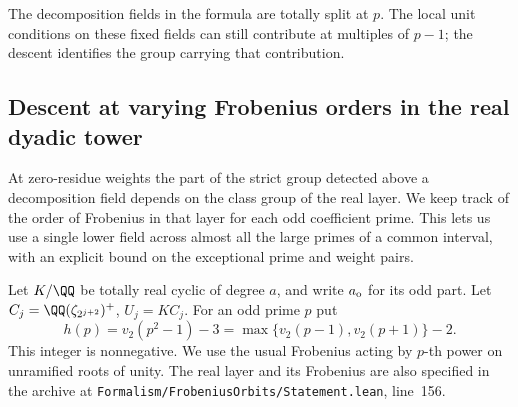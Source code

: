 \documentclass[a4paper,11pt]{article}
\theoremstyle{definition}
\theoremstyle{remark}
\newcommand{\srcloc}[2]{{\small\nolinkurl{#1.lean}}, line~#2}
\numberwithin{equation}{section}
\begin{document}
The decomposition fields in the formula are totally split at \(p\).
The local unit conditions on these fixed fields can still contribute
at multiples of \(p-1\); the descent identifies the group carrying
that contribution.


\subsection{Descent at varying Frobenius orders in the real dyadic tower}
\label{sec:varyingdecomposition642}

At zero-residue weights the part of the strict group detected
above a decomposition field depends on the class group of the
real layer. We keep track of the order of Frobenius in that
layer for each odd coefficient prime. This lets us use a single
lower field across almost all the large primes of a common
interval, with an explicit bound on the exceptional prime and
weight pairs.

Let \(K/\QQ\) be totally real cyclic of degree \(a\), and write
\(a_{\rm o}\) for its odd part. Let
\(C_j=\QQ(\zeta_{2^{j+2}})^+\), \(U_j=KC_j\). For an odd
prime \(p\) put
\[
              h(p)=v_2(p^2-1)-3
                  =\max\{v_2(p-1),v_2(p+1)\}-2 .
\]
This integer is nonnegative. We use the usual Frobenius acting
by \(p\)-th power on unramified roots of unity. The real layer
and its Frobenius are also specified in the archive at
\srcloc{Formalism/FrobeniusOrbits/Statement}{156}.
\end{document}
